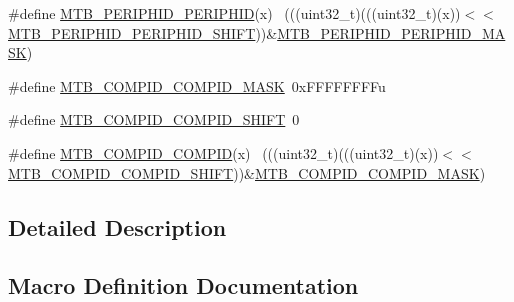\begin{DoxyCompactItemize}
\item 
\#define \hyperlink{group___m_t_b___register___masks_ga736d772d918662cd3b755b370be167b4}{M\+T\+B\+\_\+\+P\+E\+R\+I\+P\+H\+I\+D\+\_\+\+P\+E\+R\+I\+P\+H\+ID}(x)                              ~(((uint32\+\_\+t)(((uint32\+\_\+t)(x))$<$$<$\hyperlink{group___m_t_b___register___masks_gaf919275fec0a218a929c0b39be8c2929}{M\+T\+B\+\_\+\+P\+E\+R\+I\+P\+H\+I\+D\+\_\+\+P\+E\+R\+I\+P\+H\+I\+D\+\_\+\+S\+H\+I\+FT}))\&\hyperlink{group___m_t_b___register___masks_ga8be09de74be8da3de47e29838b6e7ca8}{M\+T\+B\+\_\+\+P\+E\+R\+I\+P\+H\+I\+D\+\_\+\+P\+E\+R\+I\+P\+H\+I\+D\+\_\+\+M\+A\+SK})
\item 
\#define \hyperlink{group___m_t_b___register___masks_ga29964fec46d0063c44f12d25e96d2374}{M\+T\+B\+\_\+\+C\+O\+M\+P\+I\+D\+\_\+\+C\+O\+M\+P\+I\+D\+\_\+\+M\+A\+SK}~0x\+F\+F\+F\+F\+F\+F\+F\+Fu
\item 
\#define \hyperlink{group___m_t_b___register___masks_ga3511be4cfe57cca4ef93611ab64b624a}{M\+T\+B\+\_\+\+C\+O\+M\+P\+I\+D\+\_\+\+C\+O\+M\+P\+I\+D\+\_\+\+S\+H\+I\+FT}~0
\item 
\#define \hyperlink{group___m_t_b___register___masks_ga5ee46cf3e3234159be1dceb799e31c88}{M\+T\+B\+\_\+\+C\+O\+M\+P\+I\+D\+\_\+\+C\+O\+M\+P\+ID}(x)                                      ~(((uint32\+\_\+t)(((uint32\+\_\+t)(x))$<$$<$\hyperlink{group___m_t_b___register___masks_ga3511be4cfe57cca4ef93611ab64b624a}{M\+T\+B\+\_\+\+C\+O\+M\+P\+I\+D\+\_\+\+C\+O\+M\+P\+I\+D\+\_\+\+S\+H\+I\+FT}))\&\hyperlink{group___m_t_b___register___masks_ga29964fec46d0063c44f12d25e96d2374}{M\+T\+B\+\_\+\+C\+O\+M\+P\+I\+D\+\_\+\+C\+O\+M\+P\+I\+D\+\_\+\+M\+A\+SK})
\end{DoxyCompactItemize}


\subsection{Detailed Description}


\subsection{Macro Definition Documentation}
